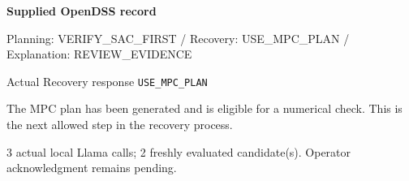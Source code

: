 \textbf{Supplied OpenDSS record}\par
{\footnotesize Planning: VERIFY\_SAC\_FIRST / Recovery: USE\_MPC\_PLAN / Explanation: REVIEW\_EVIDENCE\par}
\begin{block}{Actual Recovery response}
\texttt{USE\_MPC\_PLAN}\par
The MPC plan has been generated and is eligible for a numerical check. This is the next allowed step in the recovery process.
\end{block}
3 actual local Llama calls; 2 freshly evaluated candidate(s). Operator acknowledgment remains pending.